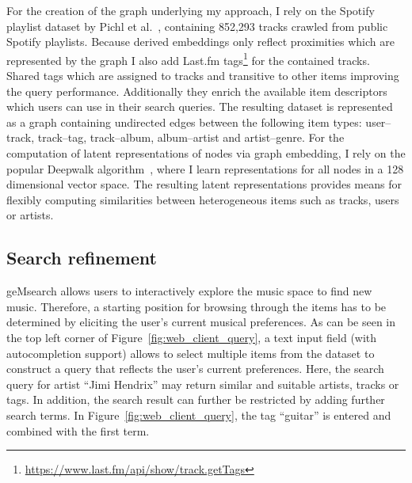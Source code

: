 \documentclass[sigconf]{acmart}
\begin{document}
For the creation of the graph underlying my approach, I rely on the Spotify playlist dataset by Pichl et al.~\cite{pichl2017improving}, containing 852,293 tracks crawled from public Spotify playlists. Because derived embeddings only reflect proximities which are represented by the graph I also add Last.fm tags\footnote{\url{https://www.last.fm/api/show/track.getTags}} for the contained tracks. Shared tags which are assigned to tracks and transitive to other items improving the query performance. Additionally they enrich the available item descriptors which users can use in their search queries. The resulting dataset is represented as a graph containing undirected edges between the following item types: user--track, track--tag, track--album, album--artist and artist--genre. For the computation of latent representations of nodes via graph embedding, I rely on the popular Deepwalk algorithm~\cite{perozzi2014deepwalk}, where I learn representations for all nodes in a 128 dimensional vector space. The resulting latent representations provides means for flexibly computing similarities between heterogeneous items such as tracks, users or artists.




\subsection{Search refinement}
geMsearch allows users to interactively explore the music space to find new music. Therefore, a starting position for browsing through the items has to be determined by eliciting the user's current musical preferences. As can be seen in the top left corner of Figure~\ref{fig:web_client_query}, a text input field (with autocompletion support) allows to select multiple items from the dataset to construct a query that reflects the user's current preferences. Here, the search query for artist ``Jimi Hendrix'' may return similar and suitable artists, tracks or tags. In addition, the search result can further be restricted by adding further search terms. In Figure~\ref{fig:web_client_query}, the tag ``guitar'' is entered and combined with the first term. \\
\end{document}
